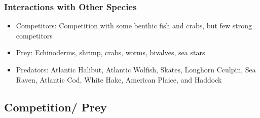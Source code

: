 \documentclass{beamer}
\numberwithin{equation}{section}		%
\numberwithin{figure}{section}		%
\numberwithin{table}{section}				%
\begin{document}
\begin{frame}
\frametitle{Interactions with Other Species}

\begin{itemize}
	\item Competitors: Competition with some benthic fish and crabs, but few strong competitors
	\item Prey: Echinoderms, shrimp, crabs, worms, bivalves, sea stars
	\item Predators: Atlantic Halibut, Atlantic Wolfish, Skates, Longhorn Cculpin, Sea Raven, Atlantic Cod, White Hake, American Plaice, and Haddock
\end{itemize}
\end{frame}





\subsection{Competition/ Prey}
\end{document}
